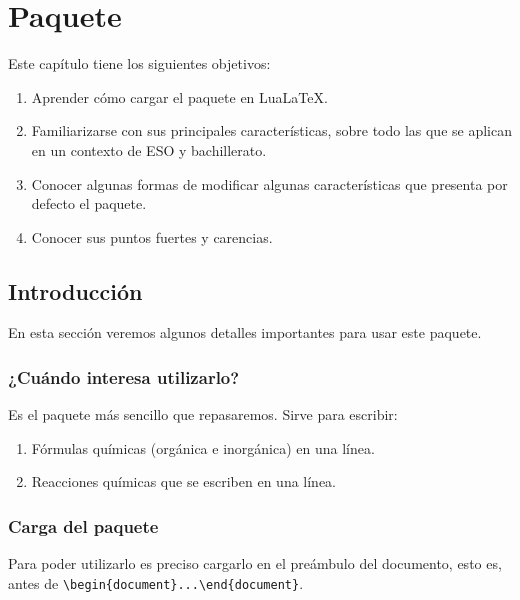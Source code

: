 %


\chapter{Paquete {}}
Este capítulo tiene los siguientes objetivos:
\begin{enumerate}
\item Aprender cómo cargar el paquete en Lua\LaTeX.
\item Familiarizarse con sus principales características, sobre todo las que se aplican
  en un contexto de ESO y bachillerato.
\item Conocer algunas formas de modificar algunas características que presenta por
  defecto el paquete.
\item Conocer sus puntos fuertes y carencias.
\end{enumerate}

\section{Introducción}
En esta sección veremos algunos detalles importantes para usar este paquete.

\subsection{¿Cuándo interesa utilizarlo?}
Es el paquete más sencillo que repasaremos.
Sirve para escribir:
\begin{enumerate}
\item Fórmulas químicas (orgánica e inorgánica) en una línea.
\item Reacciones químicas que se escriben en una línea.
\end{enumerate}

\subsection{Carga del paquete}
Para poder utilizarlo es preciso cargarlo en el preámbulo del documento, esto es,
antes de \texttt{\textbackslash begin\{document\}...\textbackslash end\{document\}}.

